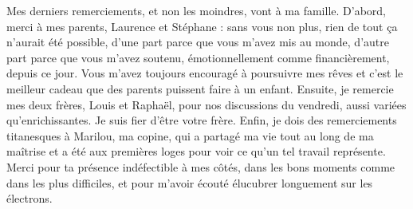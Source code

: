 Mes derniers remerciements, et non les moindres, vont à ma famille. D'abord, merci à mes parents, Laurence et Stéphane : sans vous non plus, rien de tout ça n'aurait été possible, d'une part parce que vous m'avez mis au monde, d'autre part parce que vous m'avez soutenu, émotionnellement comme financièrement, depuis ce jour. Vous m'avez toujours encouragé à poursuivre mes rêves et c'est le meilleur cadeau que des parents puissent faire à un enfant. Ensuite, je remercie mes deux frères, Louis et Raphaël, pour nos discussions du vendredi, aussi variées qu'enrichissantes. Je suis fier d'être votre frère. Enfin, je dois des remerciements titanesques à Marilou, ma copine, qui a partagé ma vie tout au long de ma maîtrise et a été aux premières loges pour voir ce qu'un tel travail représente. Merci pour ta présence indéfectible à mes côtés, dans les bons moments comme dans les plus difficiles, et pour m'avoir écouté élucubrer longuement sur les électrons.

